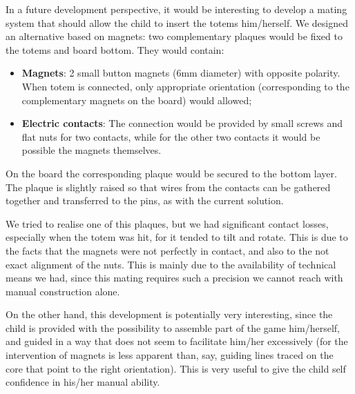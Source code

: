\documentclass[a4paper,twoside]{book}
\begin{document}
\beforelist* In a future development perspective, it would be interesting to develop a mating system that should allow the child to insert the totems him/herself. We designed an alternative based on magnets:
two complementary plaques would be fixed to the totems and board bottom. They would contain:
\begin{itemize}
\item \textbf{Magnets}: 2 small button magnets (6mm diameter) with opposite polarity. When totem is connected, only appropriate orientation (corresponding to the complementary magnets on the board) would allowed;
\item \textbf{Electric contacts}: The connection would be provided by small screws and flat nuts for two contacts, while for the other two contacts it would be possible the magnets themselves.
\end{itemize}
\afterlist*
On the board the corresponding plaque would be secured to the bottom layer. The plaque is slightly raised so that wires from the contacts can be gathered together and transferred to the pins, as with the current solution.

We tried to realise one of this plaques, but we had significant contact losses, especially when the totem was hit, for it tended to tilt and rotate. This is due to the facts that the magnets were not perfectly in contact, and also to the not exact alignment of the nuts. This is mainly due to the availability of technical means we had, since this mating requires such a precision we cannot reach with manual construction alone.

On the other hand, this development is potentially very interesting, since the child is provided with the possibility to assemble part of the game him/herself, and guided in a way that does not seem to facilitate him/her excessively (for the intervention of magnets is less apparent than, say, guiding lines traced on the core that point to the right orientation). This is very useful to give the child self confidence in his/her manual ability.
\end{document}
